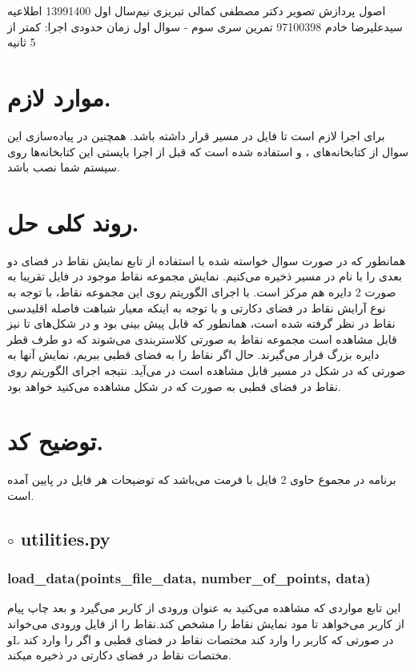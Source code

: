 \documentclass[a4paper,12pt]{article}
\begin{document}
\handout
{اصول پردازش تصویر}
{دکتر مصطفی کمالی تبریزی}
{نیم‌سال اول 1399\lr{-}1400}
{اطلاعیه}
{سیدعلیرضا خادم}
{97100398}
{تمرین سری سوم - سوال اول}
زمان حدودی اجرا: کمتر از 5 ثانیه
\section*{موارد لازم.}
برای اجرا لازم است تا فایل
در مسیر
قرار داشته باشد. همچنین در پیاده‌سازی این سوال از کتابخانه‌های 
،
و
استفاده شده است که قبل از اجرا بایستی این کتابخانه‌ها روی سیستم شما نصب باشد.
\section*{روند کلی حل.}
همانطور که در صورت سوال خواسته شده با استفاده از تابع 
نمایش نقاط در فضای دو بعدی را با نام 
در مسیر 
ذخیره می‌کنیم. نمایش مجموعه نقاط موجود در فایل 
تقریبا به صورت 2 دایره هم مرکز است. با اجرای الگوریتم 
روی این مجموعه نقاط، با توجه به نوع آرایش نقاط در فضای دکارتی و با توجه به اینکه معیار شباهت  فاصله اقلیدسی نقاط در نظر گرفته شده است، همانطور که قابل پیش بینی بود و در شکل‌های 
تا 
نیز قابل مشاهده است مجموعه نقاط به صورتی کلاستربندی می‌شوند که دو طرف قطر دایره بزرگ قرار می‌گیرند. حال اگر نقاط را به فضای قطبی ببریم، نمایش آنها به صورتی که در شکل 
در مسیر
قابل مشاهده است در می‌آید. نتیجه اجرای الگوریتم 
روی نقاط در فضای قطبی به صورت که در شکل 
مشاهده می‌کنید خواهد بود.



\section*{توضیح کد.}
برنامه در مجموع حاوی 2 فایل با فرمت
می‌باشد که توضیحات هر فایل در پایین آمده است.
\subsection*{$\circ$ utilities.py}
\subsubsection*{load\_data(points\_file\_data, number\_of\_points, data)}
این  تابع مواردی که مشاهده می‌کنید به عنوان ورودی از کاربر می‌گیرد و بعد چاپ پیام 
از کاربر می‌خواهد تا مود نمایش نقاط را مشخص کند.نقاط را از فایل ورودی می‌خواند وL در صورتی که کاربر
را وارد کند مختصات نقاط در فضای قطبی و اگر 
را وارد کند مختصات نقاط در فضای دکارتی در
ذخیره میکند.
\end{document}
